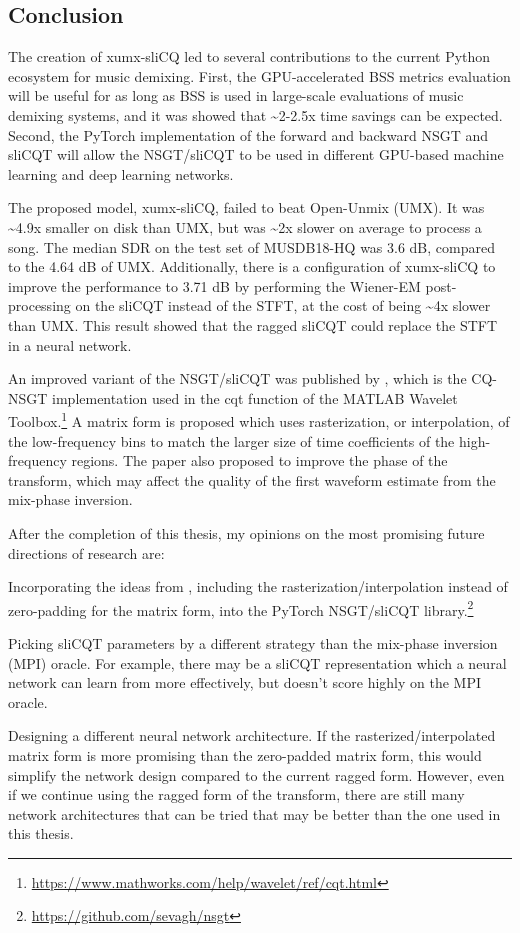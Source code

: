 \documentclass[report.tex]{subfiles}
\begin{document}
\subsection{Conclusion}
\label{sec:conclusion}

The creation of xumx-sliCQ led to several contributions to the current Python ecosystem for music demixing. First, the GPU-accelerated BSS metrics evaluation will be useful for as long as BSS is used in large-scale evaluations of music demixing systems, and it was showed that \textasciitilde2-2.5x time savings can be expected. Second, the PyTorch implementation of the forward and backward NSGT and sliCQT will allow the NSGT/sliCQT to be used in different GPU-based machine learning and deep learning networks.

The proposed model, xumx-sliCQ, failed to beat Open-Unmix (UMX). It was \textasciitilde4.9x smaller on disk than UMX, but was \textasciitilde2x slower on average to process a song. The median SDR on the test set of MUSDB18-HQ was 3.6 dB, compared to the 4.64 dB of UMX. Additionally, there is a configuration of xumx-sliCQ to improve the performance to 3.71 dB by performing the Wiener-EM post-processing on the sliCQT instead of the STFT, at the cost of being \textasciitilde4x slower than UMX. This result showed that the ragged sliCQT could replace the STFT in a neural network.

An improved variant of the NSGT/sliCQT was published by \textcite{variableq1}, which is the CQ-NSGT implementation used in the cqt function of the MATLAB Wavelet Toolbox.\footnote{\url{https://www.mathworks.com/help/wavelet/ref/cqt.html}} A matrix form is proposed which uses rasterization, or interpolation, of the low-frequency bins to match the larger size of time coefficients of the high-frequency regions. The paper also proposed to improve the phase of the transform, which may affect the quality of the first waveform estimate from the mix-phase inversion.

After the completion of this thesis, my opinions on the most promising future directions of research are:
\begin{tight_enumerate}
	\item
		Incorporating the ideas from \textcite{variableq1}, including the rasterization/interpolation instead of zero-padding for the matrix form, into the PyTorch NSGT/sliCQT library.\footnote{\url{https://github.com/sevagh/nsgt}}
	\item
		Picking sliCQT parameters by a different strategy than the mix-phase inversion (MPI) oracle. For example, there may be a sliCQT representation which a neural network can learn from more effectively, but doesn't score highly on the MPI oracle.
	\item
		Designing a different neural network architecture. If the rasterized/interpolated matrix form is more promising than the zero-padded matrix form, this would simplify the network design compared to the current ragged form. However, even if we continue using the ragged form of the transform, there are still many network architectures that can be tried that may be better than the one used in this thesis.
\end{tight_enumerate}
\end{document}

